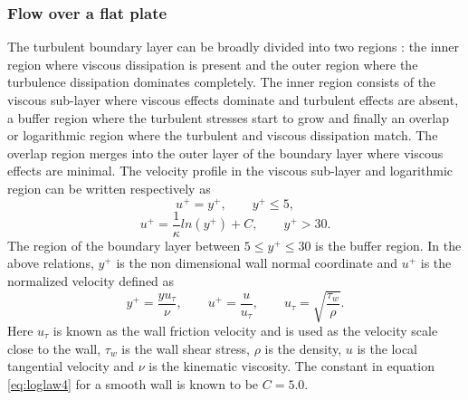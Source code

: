 \subsubsection{Flow over a flat plate}
The turbulent boundary layer can be broadly divided into two regions \cite{Pope2000,schlichting2016boundary}: the inner region where viscous dissipation is present and the outer region where the turbulence dissipation dominates completely. The inner region consists of the viscous sub-layer where viscous effects dominate and turbulent effects are absent, a buffer region where the turbulent stresses start to grow and finally an overlap or logarithmic region where the turbulent and viscous dissipation match. The overlap region merges into the outer layer of the boundary layer where viscous effects are minimal. The velocity profile in the viscous sub-layer and logarithmic region can be written respectively as
\begin{equation}
    u^+ = y^+, \qquad y^+ \leq 5,
    \label{eq:visclaw4}
\end{equation}{}
\begin{equation}
    u^+ = \frac{1}{\kappa}ln(y^+) + C, \qquad y^+ > 30.
    \label{eq:loglaw4}
\end{equation}{}
The region of the boundary layer between $5 \leq y^+ \leq 30$ is the buffer region. In the above relations, $y^+$ is the non dimensional wall normal coordinate and $u^+$ is the normalized velocity defined as
\begin{equation*}{}
y^+ = \frac{y u_{\tau}}{\nu}, \qquad u^+ = \frac{u}{u_{\tau}}, \qquad  u_{\tau} = \sqrt{\frac{\tau_w}{\rho}}.
\end{equation*}
Here $u_{\tau}$ is known as the wall friction velocity and is used as the velocity scale close to the wall, $\tau_w$ is the wall shear stress, $\rho$ is the density, $u$ is the local tangential velocity and $\nu$ is the kinematic viscosity. The constant in equation \ref{eq:loglaw4} for a smooth wall is known to be $C=5.0$.

